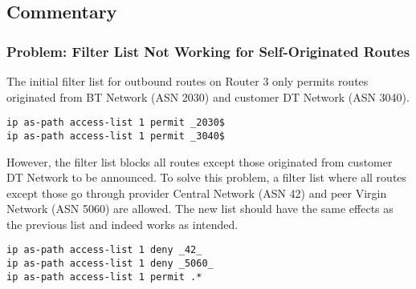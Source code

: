 \subsection{Commentary}

\subsubsection{Problem: Filter List Not Working for Self-Originated Routes}

The initial filter list for outbound routes on Router 3 only permits routes originated from BT Network (ASN 2030) and customer DT Network (ASN 3040).

\begin{lstlisting}
ip as-path access-list 1 permit _2030$
ip as-path access-list 1 permit _3040$
\end{lstlisting}

However, the filter list blocks all routes except those originated from customer DT Network to be announced. To solve this problem, a filter list where all routes except those go through provider Central Network (ASN 42) and peer Virgin Network (ASN 5060) are allowed. The new list should have the same effects as the previous list and indeed works as intended.

\begin{lstlisting}
ip as-path access-list 1 deny _42_
ip as-path access-list 1 deny _5060_
ip as-path access-list 1 permit .*
\end{lstlisting}




